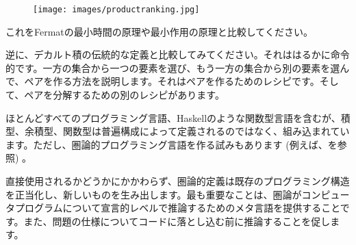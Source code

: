 \begin{figure}[H]
  \centering
  \texttt{[image: images/productranking.jpg]}
\end{figure}

\noindent
これをFermatの最小時間の原理や最小作用の原理と比較してください。

逆に、デカルト積の伝統的な定義と比較してみてください。それははるかに命令的です。一方の集合から一つの要素を選び、もう一方の集合から別の要素を選んで、ペアを作る方法を説明します。それはペアを作るためのレシピです。そして、ペアを分解するための別のレシピがあります。

ほとんどすべてのプログラミング言語、Haskellのような関数型言語を含むが、積型、余積型、関数型は普遍構成によって定義されるのではなく、組み込まれています。ただし、圏論的プログラミング言語を作る試みもあります (例えば、を参照) 。

直接使用されるかどうかにかかわらず、圏論的定義は既存のプログラミング構造を正当化し、新しいものを生み出します。最も重要なことは、圏論がコンピュータプログラムについて宣言的レベルで推論するためのメタ言語を提供することです。また、問題の仕様についてコードに落とし込む前に推論することを促します。

